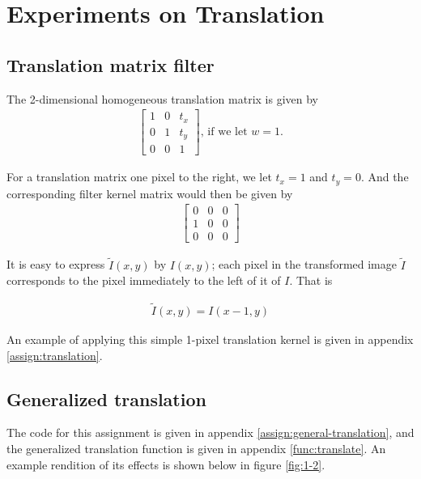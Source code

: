 %
%

\section{Experiments on Translation}

\subsection{Translation matrix filter}

\begin{multicols}{2}
    
    The 2-dimensional homogeneous translation matrix is given by
    \begin{align}
        \begin{bmatrix}
            1 & 0 & t_x \\
            0 & 1 & t_y \\
            0 & 0 & 1
        \end{bmatrix}
        \text{, if we let $w=1$.}
    \end{align}
    
    For a translation matrix one pixel to the right, we let $t_x=1$ and
    $t_y=0$. And the corresponding filter kernel matrix would then be given by
    \begin{align}
        \begin{bmatrix}
            0 & 0 & 0 \\
            1 & 0 & 0 \\
            0 & 0 & 0
        \end{bmatrix}
    \end{align}
    
    \vfill\columnbreak
    
    It is easy to express $\widetilde{I}(x,y)$ by $I(x,y)$; each pixel in the
    transformed image $\widetilde{I}$ corresponds to the pixel immediately to
    the left of it of $I$. That is

    \begin{align}
        \widetilde{I}(x,y) = I(x-1,y)
    \end{align}
    
    An example of applying this simple 1-pixel translation kernel is given in
    appendix \ref{assign:translation}.

\end{multicols}

\subsection{Generalized translation}
The code for this assignment is given in appendix
\ref{assign:general-translation}, and the generalized translation function is
given in appendix \ref{func:translate}. An example rendition of its effects is
shown below in figure \ref{fig:1-2}.

